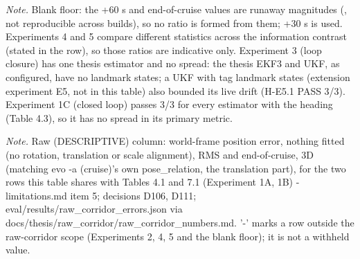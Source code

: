 \begin{table}[htbp]
\textit{Note.} Blank floor: the +60 s and end-of-cruise values are runaway magnitudes (\textdagger{}, not reproducible across builds), so no ratio is formed from them; +30 s is used. Experiments 4 and 5 compare different statistics across the information contrast (stated in the row), so those ratios are indicative only. Experiment 3 (loop closure) has one thesis estimator and no spread: the thesis EKF3 and UKF, as configured, have no landmark states; a UKF with tag landmark states (extension experiment E5, not in this table) also bounded its live drift (H-E5.1 PASS 3/3). Experiment 1C (closed loop) passes 3/3 for every estimator with the heading (Table 4.3), so it has no spread in its primary metric.\par
\textit{Note.} Raw (DESCRIPTIVE) column: world-frame position error, nothing fitted (no rotation, translation or scale alignment), RMS and end-of-cruise, 3D (matching evo -a (cruise)'s own pose\_relation, the translation part), for the two rows this table shares with Tables 4.1 and 7.1 (Experiment 1A, 1B) - limitations.md item 5; decisions D106, D111; eval/results/raw\_corridor\_errors.json via docs/thesis/raw\_corridor/raw\_corridor\_numbers.md. '-' marks a row outside the raw-corridor scope (Experiments 2, 4, 5 and the blank floor); it is not a withheld value.\par
\end{table}
